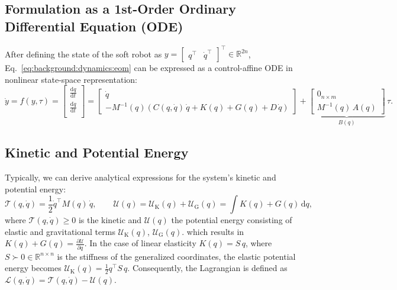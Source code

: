 \subsection{Formulation as a 1st-Order Ordinary Differential Equation (ODE)}
After defining the state of the soft robot as $y = \begin{bmatrix}
    q^\top & \dot{q}^\top
\end{bmatrix}^\top \in \mathbb{R}^{2n}$, Eq.~\ref{eq:background:dynamics:eom} can be expressed as a control-affine \gls{ODE} in nonlinear state-space representation:
\begin{equation}
    \dot{y} = f(y,\tau) = \begin{bmatrix}
        \frac{\mathrm{d} q}{\mathrm{d}t}\\
        \frac{\mathrm{d} \dot{q}}{\mathrm{d}t}\\
    \end{bmatrix} = \begin{bmatrix}
        \dot{q}\\
        -M^{-1}(q) \left ( C(q,\dot{q}) \, \dot{q} + K(q) + G(q) + D \, \dot{q} \right )
    \end{bmatrix} + \underbrace{\begin{bmatrix}
        0_{n \times m}\\ M^{-1}(q) \, A(q)
    \end{bmatrix}}_{B(q)} \, \tau.
\end{equation}

\subsection{Kinetic and Potential Energy}
Typically, we can derive analytical expressions for the system’s kinetic and potential energy:
\begin{equation}
    \mathcal{T}(q,\dot{q}) = \frac{1}{2} \dot{q}^\top M(q) \, \dot{q},
    \qquad
    \mathcal{U}(q) = \mathcal{U}_\mathrm{K}(q) + \mathcal{U}_\mathrm{G}(q) = \int K(q) + G(q) \, \mathrm{d}q,
\end{equation}
where $\mathcal{T}(q,\dot{q}) \geq 0$ is the kinetic and $\mathcal{U}(q)$ the potential energy consisting of elastic and gravitational terms $\mathcal{U}_\mathrm{K}(q)$, $\mathcal{U}_\mathrm{G}(q)$.
which results in $K(q) + G(q) = \frac{\partial \mathcal{U}}{\partial q}$. 
In the case of linear elasticity $K(q) = S \, q$, where $S \succ 0 \in \mathbb{R}^{n \times n}$ is the stiffness of the generalized coordinates, the elastic potential energy becomes $\mathcal{U}_\mathrm{K}(q) = \frac{1}{2} q^\top S \, q$.
Consequently, the Lagrangian is defined as $\mathcal{L}(q,\dot{q}) = \mathcal{T}(q,\dot{q}) - \mathcal{U}(q)$.

